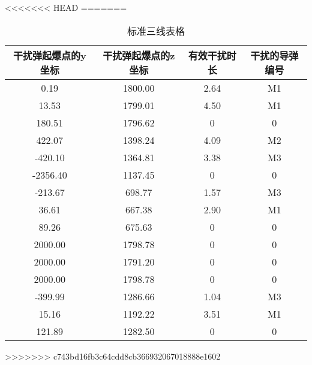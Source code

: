 \documentclass[../main.tex]{subfiles}
\begin{document}
<<<<<<< HEAD
=======
\begin{table}[H]
\caption{标准三线表格}
\label{tab:031} 
\centering
\begin{small}
\begin{tabular}{cccc}
\toprule[1.5pt]
干扰弹起爆点的y坐标&干扰弹起爆点的z坐标&有效干扰时长 &干扰的导弹编号\\
\midrule[1pt]
0.19    & 1800.00 & 2.64 & M1 \\
    13.53   & 1799.01 & 4.50 & M1 \\
    180.51  & 1796.62 & 0    & 0 \\
    422.07  & 1398.24 & 4.09 & M2 \\
    -420.10 & 1364.81 & 3.38 & M3 \\
    -2356.40& 1137.45 & 0    & 0 \\
    -213.67 & 698.77  & 1.57 & M3 \\
    36.61   & 667.38  & 2.90 & M1 \\
    89.26   & 675.63  & 0    & 0 \\
    2000.00 & 1798.78 & 0    & 0 \\
    2000.00 & 1791.20 & 0    & 0 \\
    2000.00 & 1798.78 & 0    & 0 \\
    -399.99 & 1286.66 & 1.04 & M3 \\
    15.16   & 1192.22 & 3.51 & M1 \\
    121.89  & 1282.50 & 0    & 0 \\             
\bottomrule[1.5pt]
\end{tabular}
\end{small}
\end{table}


>>>>>>> c743bd16fb3c64cdd8cb366932067018888e1602
\end{document}
